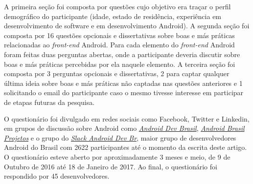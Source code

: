 A primeira seção foi composta por questões cujo objetivo era traçar o perfil demográfico do participante (idade, estado de residência, experiência em desenvolvimento de software e em desenvolvimento Android).
A segunda seção foi composta por 16 questões opcionais e dissertativas sobre boas e más práticas relacionadas ao \textit{front-end} Android. Para cada elemento do \textit{front-end} Android foram feitas duas perguntas abertas, onde a participante deveria discutir sobre boas e más práticas percebidas por ela naquele elemento. 
A terceira seção foi composta por 3 perguntas opcionais e dissertativas, 2 para captar qualquer última ideia sobre boas e más práticas não captadas nas questões anteriores e 1 solicitando o email do participante caso o mesmo tivesse interesse em participar de etapas futuras da pesquisa. 







O questionário foi divulgado em redes sociais como Facebook, Twitter e Linkedin, em grupos de discussão sobre Android como \href{https://groups.google.com/forum/#!forum/androidbrasil-dev}{\textit{Android Dev Brasil}}, \href{https://groups.google.com/forum/\#!forum/android-brasil--projetos}{\textit{Android Brasil Projetos}} e o grupo do \href{http://slack.androiddevbr.org/}{\textit{Slack Android Dev Br}}, maior grupo de desenvolvedores Android do Brasil com 2622 participantes até o momento da escrita deste artigo. 
O questionário esteve aberto por aproximadamente 3 meses e meio, de 9 de Outubro de 2016 até 18 de Janeiro de 2017. 
Ao final, o questionário foi respondido por 45 desenvolvedores. 

